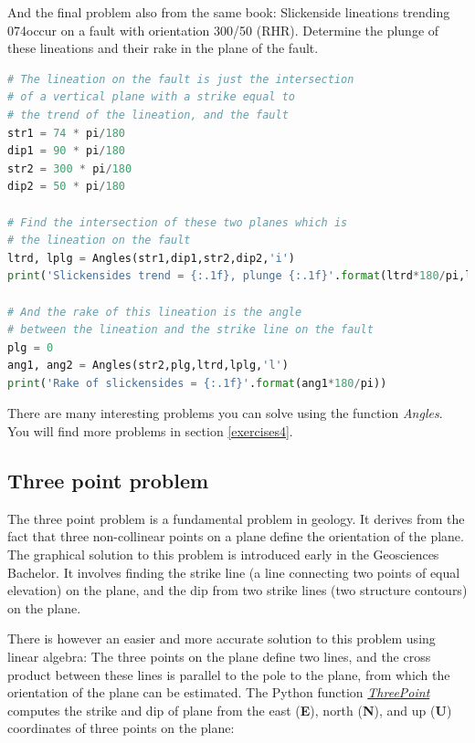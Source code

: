 \documentclass[a4paper , 12pt]{book}
\begin{document}
And the final problem also from the same book: Slickenside lineations trending 074\degree occur on a fault with orientation 300/50 (RHR). Determine the plunge of these lineations and their rake in the plane of the fault.

\begin{center}
\begin{lstlisting}[language=Python, frame=single]
# The lineation on the fault is just the intersection
# of a vertical plane with a strike equal to
# the trend of the lineation, and the fault
str1 = 74 * pi/180
dip1 = 90 * pi/180
str2 = 300 * pi/180
dip2 = 50 * pi/180

# Find the intersection of these two planes which is
# the lineation on the fault
ltrd, lplg = Angles(str1,dip1,str2,dip2,'i')
print('Slickensides trend = {:.1f}, plunge {:.1f}'.format(ltrd*180/pi,lplg*180/pi))

# And the rake of this lineation is the angle
# between the lineation and the strike line on the fault
plg = 0
ang1, ang2 = Angles(str2,plg,ltrd,lplg,'l')
print('Rake of slickensides = {:.1f}'.format(ang1*180/pi))
\end{lstlisting}
\end{center}

There are many interesting problems you can solve using the function \textit{Angles}. You will find more problems in section \ref{exercises4}.

\subsection{Three point problem}

The three point problem is a fundamental problem in geology. It derives from the fact that three non-collinear points on a plane define the orientation of the plane. The graphical solution to this problem is introduced early in the Geosciences Bachelor. It involves finding the strike line (a line connecting two points of equal elevation) on the plane, and the dip from two strike lines (two structure contours) on the plane. 

There is however an easier and more accurate solution to this problem using linear algebra: The three points on the plane define two lines, and the cross product between these lines is parallel to the pole to the plane, from which the orientation of the plane can be estimated. The Python function \href{http://github.com}{\textit{ThreePoint}} computes the strike and dip of plane from the east (\textbf{E}), north (\textbf{N}), and up (\textbf{U}) coordinates of three points on the plane:
\end{document}
